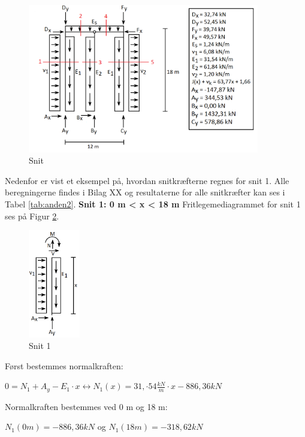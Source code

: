 \begin{figure}[H]
	\centering
	\includegraphics[width=0.9\textwidth]{billeder/snitanvendelse.png}
	\caption{Snit}
	\label{fig:snitanvendelse}
\end{figure}

Nedenfor er vist et eksempel på, hvordan snitkræfterne regnes for snit 1. Alle beregningerne findes i Bilag XX og resultaterne for alle snitkræfter kan ses i Tabel \ref{tab:anden2}.
\newline
\newline
\textbf{Snit 1: 0 m < x < 18 m}
\newline
Fritlegemediagrammet for snit 1 ses på Figur \ref{fig:snitetan}.
\begin{figure}[H]
	\centering
	\includegraphics[width=0.2\textwidth]{billeder/asnitet.png}
	\caption{Snit 1}
	\label{fig:snitetan}
\end{figure}

Først bestemmes normalkraften:
\begin{center}
	$0 = N_1 + A_y - E_1\cdot x \leftrightarrow N_1(x) = 31,\cdot54 \frac{kN}{m} \cdot x - 886,\!36 kN$
\end{center}

Normalkraften bestemmes ved 0 m og 18 m:
\begin{center}
	$N_1(0m) = -886,\!36 kN$ og $N_1(18m) = -318,\!62 kN$
\end{center}

